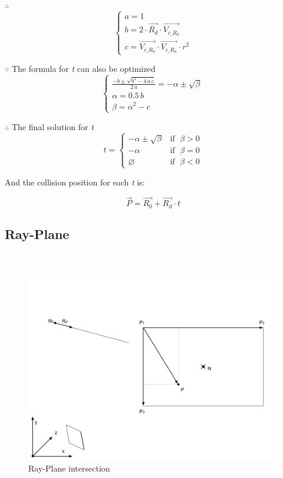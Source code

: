 $\therefore$
\[
\left\{
\begin{array}{lr}
a =1 \\
b = 2 \cdot \overrightarrow{R_d} \cdot \overrightarrow{V_{c\_R_0}} \\
c = \overrightarrow{V_{c\_R_0}} \cdot \overrightarrow{V_{c\_R_0}} \cdot r^2
\end{array}
\right.
\]

$\because$ The formula for \emph{t} can also be optimized
\[
\left\{
\begin{array}{lr}
\frac{-b \pm \sqrt{b^2 - 4\,a\,c}}{2\,a} = -\alpha \pm \sqrt{\beta} \\
\alpha = 0.5\,b \\
\beta = \alpha^2 - c
\end{array}
\right.
\]

$\therefore$ The final solution for \emph{t}
\[
t =
\begin{cases}
 -\alpha \pm \sqrt{\beta} & \text{if }\;\beta > 0 \\
-\alpha & \text{if }\;\beta = 0 \\
\varnothing & \text{if }\;\beta < 0
\end{cases}
\]

And the collision position for each \emph{t} is:

\[
\overrightarrow{P} = \overrightarrow{R_0} + \overrightarrow{R_d} \cdot t
\]

\subsection{Ray-Plane}
\parencite{stackoverflow.ray-plane.2014} \\

\begin{figure}[H]\label{fig:ray-plane}
\centering
\includegraphics[width=\linewidth]{Figures/ray-plane-intersection.png}
\decoRule
\caption[ray-plane-intersection]{Ray-Plane intersection}
\end{figure}

